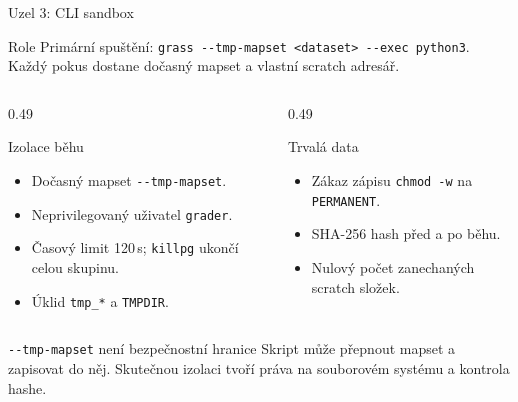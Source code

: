 \documentclass[aspectratio=169,10pt]{beamer}
\begin{document}
\begin{frame}[t]{Uzel 3: CLI sandbox}
  \small
  \begin{block}{Role}
    Primární spuštění:
    \texttt{grass -{}-tmp-mapset \textless dataset\textgreater{} -{}-exec python3}.
    Každý pokus dostane dočasný mapset a vlastní scratch adresář.
  \end{block}

  \begin{columns}[T,onlytextwidth]
    \begin{column}{0.49\textwidth}
      \begin{block}{Izolace běhu}
        \begin{itemize}
          \item Dočasný mapset \texttt{-{}-tmp-mapset}.
          \item Neprivilegovaný uživatel \texttt{grader}.
          \item Časový limit 120\,s; \texttt{killpg} ukončí celou skupinu.
          \item Úklid \texttt{tmp\_*} a \texttt{TMPDIR}.
        \end{itemize}
      \end{block}
    \end{column}
    \begin{column}{0.49\textwidth}
      \begin{block}{Trvalá data}
        \begin{itemize}
          \item Zákaz zápisu \texttt{chmod -w} na \texttt{PERMANENT}.
          \item SHA-256 hash před a po běhu.
          \item Nulový počet zanechaných scratch složek.
        \end{itemize}
      \end{block}
    \end{column}
  \end{columns}

  \begin{alertblock}{\texttt{-{}-tmp-mapset} není bezpečnostní hranice}
    Skript může přepnout mapset a zapisovat do něj. Skutečnou izolaci tvoří
    práva na souborovém systému a kontrola hashe.
  \end{alertblock}
\end{frame}
\end{document}
